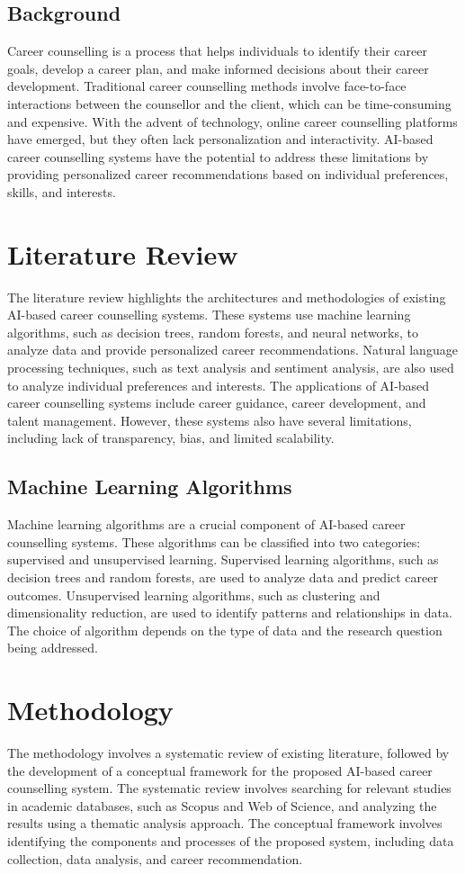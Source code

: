 \documentclass[12pt,a4paper]{article}
\begin{document}
\subsection{Background}
Career counselling is a process that helps individuals to identify their career goals, develop a career plan, and make informed decisions about their career development. Traditional career counselling methods involve face-to-face interactions between the counsellor and the client, which can be time-consuming and expensive. With the advent of technology, online career counselling platforms have emerged, but they often lack personalization and interactivity. AI-based career counselling systems have the potential to address these limitations by providing personalized career recommendations based on individual preferences, skills, and interests.

\section{Literature Review}
The literature review highlights the architectures and methodologies of existing AI-based career counselling systems. These systems use machine learning algorithms, such as decision trees, random forests, and neural networks, to analyze data and provide personalized career recommendations. Natural language processing techniques, such as text analysis and sentiment analysis, are also used to analyze individual preferences and interests. The applications of AI-based career counselling systems include career guidance, career development, and talent management. However, these systems also have several limitations, including lack of transparency, bias, and limited scalability.

\subsection{Machine Learning Algorithms}
Machine learning algorithms are a crucial component of AI-based career counselling systems. These algorithms can be classified into two categories: supervised and unsupervised learning. Supervised learning algorithms, such as decision trees and random forests, are used to analyze data and predict career outcomes. Unsupervised learning algorithms, such as clustering and dimensionality reduction, are used to identify patterns and relationships in data. The choice of algorithm depends on the type of data and the research question being addressed.

\section{Methodology}
The methodology involves a systematic review of existing literature, followed by the development of a conceptual framework for the proposed AI-based career counselling system. The systematic review involves searching for relevant studies in academic databases, such as Scopus and Web of Science, and analyzing the results using a thematic analysis approach. The conceptual framework involves identifying the components and processes of the proposed system, including data collection, data analysis, and career recommendation.
\end{document}
